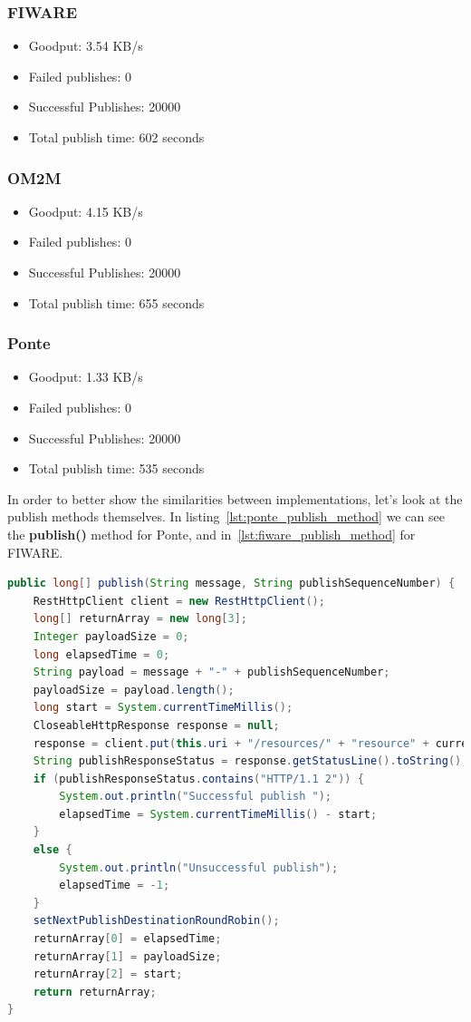 \documentclass[conference]{IEEEtran}
\begin{document}
\subsubsection{FIWARE}
\begin{itemize}
\item Goodput: 3.54 KB/s
\item Failed publishes: 0
\item Successful Publishes: 20000
\item Total publish time: 602 seconds
\end{itemize}

\subsubsection{OM2M}
\begin{itemize}
\item Goodput: 4.15 KB/s
\item Failed publishes: 0
\item Successful Publishes: 20000
\item Total publish time: 655 seconds
\end{itemize}

\subsubsection{Ponte}
\begin{itemize}
\item Goodput: 1.33 KB/s
\item Failed publishes: 0
\item Successful Publishes: 20000
\item Total publish time: 535 seconds
\end{itemize}

In order to better show the similarities between implementations, let's look at the publish methods themselves. In listing~\ref{lst:ponte_publish_method} we can see the \textbf{publish()} method for Ponte, and in~\ref{lst:fiware_publish_method} for FIWARE. 

\begin{lstlisting}[caption=Publish method for Ponte, captionpos=b, label=lst:ponte_publish_method, language=java]
public long[] publish(String message, String publishSequenceNumber) {
	RestHttpClient client = new RestHttpClient();
	long[] returnArray = new long[3];
	Integer payloadSize = 0;
	long elapsedTime = 0;
	String payload = message + "-" + publishSequenceNumber;
	payloadSize = payload.length();
	long start = System.currentTimeMillis();
	CloseableHttpResponse response = null;
	response = client.put(this.uri + "/resources/" + "resource" + currentResource + "/" + "attribute" + currentAttribute, null, payload);
	String publishResponseStatus = response.getStatusLine().toString();		
	if (publishResponseStatus.contains("HTTP/1.1 2")) {
		System.out.println("Successful publish ");
		elapsedTime = System.currentTimeMillis() - start;
	}
	else {
		System.out.println("Unsuccessful publish");
		elapsedTime = -1;
	}		
	setNextPublishDestinationRoundRobin();
	returnArray[0] = elapsedTime;
	returnArray[1] = payloadSize;
	returnArray[2] = start;
	return returnArray;
}
\end{lstlisting}
\end{document}
